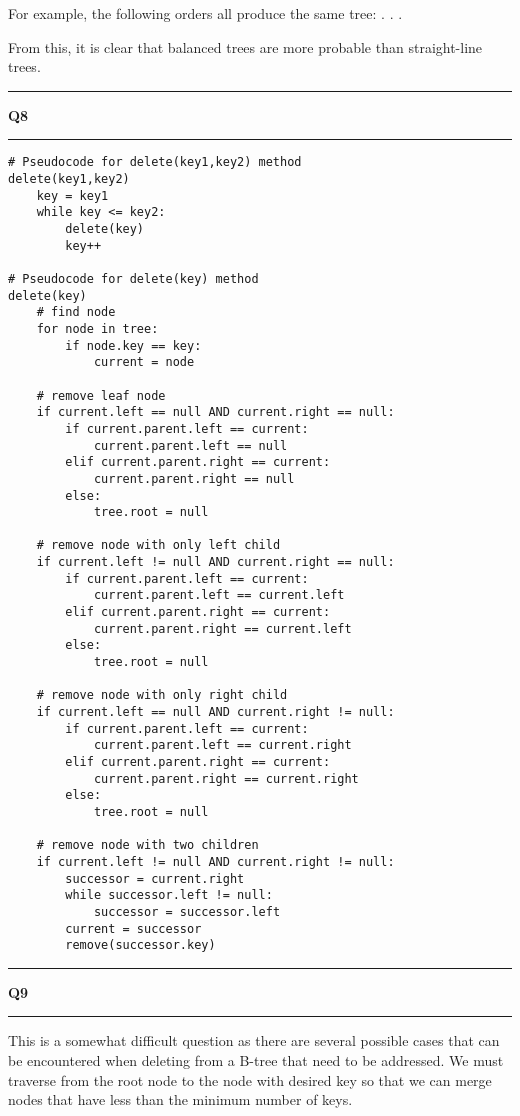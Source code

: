 \documentclass[11pt]{article}
\newcommand\question[2]{\vspace{.25in}\hrule\textbf{#1 #2}\vspace{.5em}\hrule\vspace{.10in}}
\begin{document}
For example, the following orders all produce the same tree: \newline
[4, 2, 6, 1, 3, 5, 7] \newline
[4, 2, 6, 1, 3, 7, 5] \newline
[4, 2, 6, 1, 5, 3, 7] \newline
[4, 2, 6, 1, 5, 7, 3] \newline
[4, 2, 6, 1, 7, 3, 5] \newline
[4, 2, 6, 1, 7, 5, 3] \newline
. \newline
. \newline
. \newline

From this, it is clear that balanced trees are more probable than straight-line trees.

\question{Q8}{}
\begin{lstlisting}
# Pseudocode for delete(key1,key2) method
delete(key1,key2)
	key = key1
	while key <= key2:
		delete(key)
		key++

# Pseudocode for delete(key) method
delete(key)
	# find node
	for node in tree:
		if node.key == key:
			current = node
	
	# remove leaf node
	if current.left == null AND current.right == null:
		if current.parent.left == current:
			current.parent.left == null
		elif current.parent.right == current: 
			current.parent.right == null
		else:
			tree.root = null
	
	# remove node with only left child
	if current.left != null AND current.right == null:
		if current.parent.left == current:
			current.parent.left == current.left
		elif current.parent.right == current: 
			current.parent.right == current.left
		else:
			tree.root = null
	
	# remove node with only right child
	if current.left == null AND current.right != null:
		if current.parent.left == current:
			current.parent.left == current.right
		elif current.parent.right == current: 
			current.parent.right == current.right
		else:
			tree.root = null
	
	# remove node with two children
	if current.left != null AND current.right != null:
		successor = current.right
		while successor.left != null:
			successor = successor.left
		current = successor
		remove(successor.key)

\end{lstlisting}

\question{Q9 }{}
This is a somewhat difficult question as there are several possible cases that can be encountered when deleting from a B-tree that need to be addressed. We must traverse from the root node to the node with desired key so that we can merge nodes that have less than the minimum number of keys.
\end{document}
